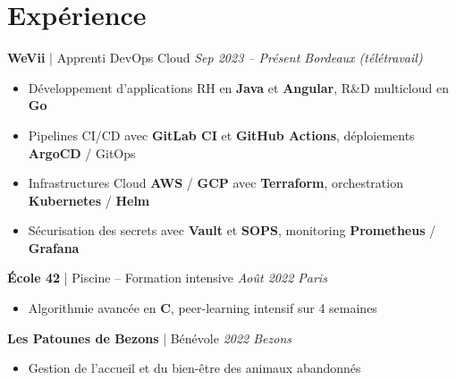 \section{\icon{\faBriefcase} Exp\'{e}rience}

\textbf{\color{accent}WeVii}
\textcolor{muted}{| Apprenti DevOps Cloud}
\hfill \textit{\small Sep 2023 -- Pr\'{e}sent \textperiodcentered{} Bordeaux (t\'{e}l\'{e}travail)}
\begin{itemize}
  \item D\'{e}veloppement d'applications RH en \textbf{Java} et \textbf{Angular}, R\&D multicloud en \textbf{Go}
  \item Pipelines CI/CD avec \textbf{GitLab CI} et \textbf{GitHub Actions}, d\'{e}ploiements \textbf{ArgoCD} / GitOps
  \item Infrastructures Cloud \textbf{AWS} / \textbf{GCP} avec \textbf{Terraform}, orchestration \textbf{Kubernetes} / \textbf{Helm}
  \item S\'{e}curisation des secrets avec \textbf{Vault} et \textbf{SOPS}, monitoring \textbf{Prometheus} / \textbf{Grafana}
\end{itemize}
\vspace{0.15cm}

\textbf{\color{accent}\'{E}cole 42}
\textcolor{muted}{| Piscine -- Formation intensive}
\hfill \textit{\small Ao\^{u}t 2022 \textperiodcentered{} Paris}
\begin{itemize}
  \item Algorithmie avanc\'{e}e en \textbf{C}, peer-learning intensif sur 4 semaines
\end{itemize}
\vspace{0.15cm}

\textbf{\color{accent}Les Patounes de Bezons}
\textcolor{muted}{| B\'{e}n\'{e}vole}
\hfill \textit{\small 2022 \textperiodcentered{} Bezons}
\begin{itemize}
  \item Gestion de l'accueil et du bien-\^{e}tre des animaux abandonn\'{e}s
\end{itemize}

